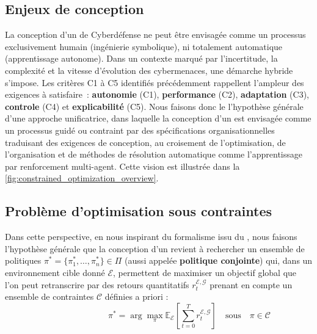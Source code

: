 \subsection{Enjeux de conception}

La conception d'un  de Cyberdéfense ne peut être envisagée comme un processus exclusivement humain (ingénierie symbolique), ni totalement automatique (apprentissage autonome). Dans un contexte marqué par l'incertitude, la complexité et la vitesse d'évolution des cybermenaces, une démarche hybride s'impose.
%
Les critères C1 à C5 identifiés précédemment rappellent l'ampleur des exigences à satisfaire~: \textbf{autonomie} (C1), \textbf{performance} (C2), \textbf{adaptation} (C3), \textbf{controle} (C4) et \textbf{explicabilité} (C5).
%
Nous faisons donc le l'hypothèse générale d'une approche unificatrice, dans laquelle la conception d'un  est envisagée comme un processus guidé ou contraint par des spécifications organisationnelles traduisant des exigences de conception, au croisement de l'optimisation, de l'organisation et de méthodes de résolution automatique comme l'apprentissage par renforcement multi-agent. Cette vision est illustrée dans la \autoref{fig:constrained_optimization_overview}.

\subsection{Problème d'optimisation sous contraintes}

Dans cette perspective, en nous inspirant du formalisme issu du , nous faisons l'hypothèse générale que la conception d'un  revient à rechercher un ensemble de politiques $\pi^* = \{\pi^*_1, \dots, \pi^*_n\} \in \Pi$ (aussi appelée \textbf{politique conjointe}) qui, dans un environnement cible donné $\mathcal{E}$, permettent de maximiser un objectif global que l'on peut retranscrire par des retours quantitatifs $r^{\mathcal{E}, \mathcal{G}}_t$ prenant en compte un ensemble de contraintes $\mathcal{C}$ définies a priori :
%
\[
  \hspace{3cm}\pi^* = \arg\max_{\pi} \mathbb{E}_{\mathcal{E}} \left[ \sum_{t=0}^{T} r^{\mathcal{E}, \mathcal{G}}_t \right] \quad \text{sous} \quad \pi \in \mathcal{C}
\]

